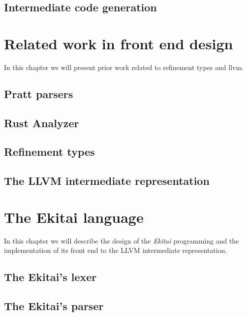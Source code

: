 \documentclass[
    oneside,
    english,
    embeddedlogo,
    noabntexcite
]{ufsc-thesis-rn46-2019}
\begin{document}
\section{Intermediate code generation}\label{chapter:background:sec:intermediate}

\chapter{Related work in front end design}\label{chapter:related_work}

In this chapter we will present prior work related to refinement types and llvm.
\section{Pratt parsers}
\section{Rust Analyzer}
\section{Refinement types}
\section{The LLVM intermediate representation}

\chapter{The Ekitai language}\label{chapter:proposal}

In this chapter we will describe the design of the \textit{Ekitai} programming and the implementation of its front end to the LLVM intermediate representation.

\section{The Ekitai's lexer}

\section{The Ekitai's parser}
\end{document}
